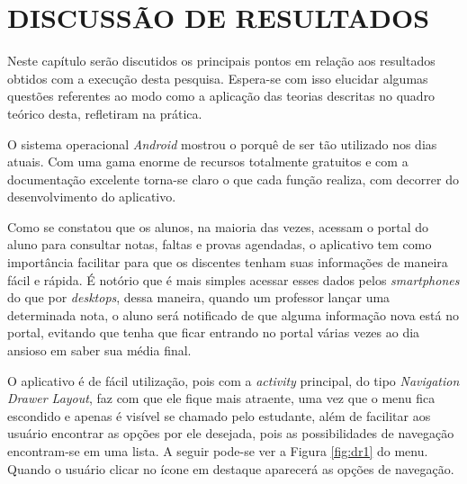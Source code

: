 
\chapter{DISCUSSÃO DE RESULTADOS} 

	\par Neste capítulo serão discutidos os principais pontos em relação 
aos resultados obtidos com a execução desta pesquisa. Espera-se com isso
elucidar algumas questões referentes ao modo como a aplicação das teorias
descritas no quadro teórico desta, refletiram na prática.

	\par O sistema operacional \textit{Android} mostrou o porquê de ser tão
utilizado nos dias atuais. Com uma gama enorme de recursos totalmente gratuitos
e com a documentação excelente torna-se claro o que cada função realiza, com
decorrer do desenvolvimento do aplicativo.

	\par Como se constatou que os alunos, na maioria das vezes, acessam o portal
do aluno para consultar notas, faltas e provas agendadas, o aplicativo tem
como importância facilitar para que os discentes tenham suas informações de
maneira fácil e rápida. É notório que é mais simples acessar esses dados pelos
\textit{smartphones} do que por \textit{desktops}, dessa maneira, quando um
professor lançar uma determinada nota, o aluno será notificado de que alguma
informação nova está no portal, evitando que tenha que ficar entrando no portal
várias vezes ao dia ansioso em saber sua média final.

	\par O aplicativo é de fácil utilização, pois com a \textit{activity}
principal, do tipo \textit{Navigation Drawer Layout}, faz com que ele fique
mais atraente, uma vez que o menu fica escondido e apenas é visível se chamado
pelo estudante, além de facilitar aos usuário encontrar as opções por ele
desejada, pois as possibilidades de navegação encontram-se em uma lista. A
seguir pode-se ver a Figura \ref{fig:dr1} do menu. Quando o usuário clicar
no ícone em destaque aparecerá as opções de navegação.

